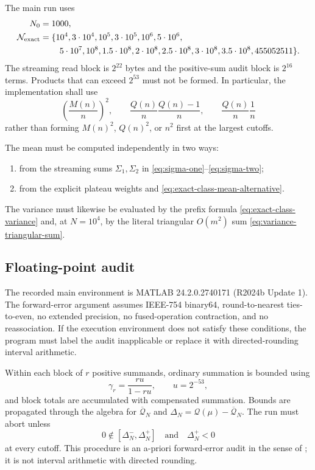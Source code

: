 \documentclass[11pt,reqno]{amsart}
\numberwithin{equation}{section}
\theoremstyle{plain}
\theoremstyle{definition}
\theoremstyle{remark}
\newcommand{\QF}{\mathcal Q}
\begin{document}
The main run uses
\begin{align}
N_0&=1000,
\label{eq:reproducibility-n-zero}\\
\mathcal N_{\mathrm{exact}}
&=\{10^4,3\cdot10^4,10^5,3\cdot10^5,10^6,5\cdot10^6,
\notag\\
&\hspace{8mm}5\cdot10^7,10^8,1.5\cdot10^8,2\cdot10^8,
2.5\cdot10^8,3\cdot10^8,3.5\cdot10^8,455052511\}.
\label{eq:reproducibility-exact-cutoffs}
\end{align}
The streaming read block is \(2^{22}\) bytes and the positive-sum audit
block is \(2^{16}\) terms.  Products that can exceed
\(2^{53}\) must not be formed.  In particular, the implementation shall use
\begin{equation}
\left(\frac{M(n)}n\right)^2,\qquad
\frac{Q(n)}n\frac{Q(n)-1}{n},\qquad
\frac{Q(n)}n\frac1n
\label{eq:safe-division-forms}
\end{equation}
rather than forming \(M(n)^2\), \(Q(n)^2\), or \(n^2\) first at the largest
cutoffs.

The mean must be computed independently in two ways:
\begin{enumerate}[label=(\alph*)]
\item from the streaming sums \(\Sigma_1,\Sigma_2\) in
\eqref{eq:sigma-one}--\eqref{eq:sigma-two};
\item from the explicit plateau weights and
\eqref{eq:exact-class-mean-alternative}.
\end{enumerate}
The variance must likewise be evaluated by the prefix formula
\eqref{eq:exact-class-variance} and, at \(N=10^4\), by the literal triangular
\(O(m^2)\) sum \eqref{eq:variance-triangular-sum}.

\subsection{Floating-point audit}
\label{subsec:floating-point-audit}

The recorded main environment is MATLAB
24.2.0.2740171 (R2024b Update 1).  The forward-error argument assumes
IEEE-754 binary64, round-to-nearest ties-to-even, no extended precision, no
fused-operation contraction, and no reassociation.  If the execution
environment does not satisfy these conditions, the program must label the
audit inapplicable or replace it with directed-rounding interval arithmetic.

Within each block of \(r\) positive summands, ordinary summation is bounded
using
\begin{equation}
\gamma_r=\frac{ru}{1-ru},\qquad u=2^{-53},
\label{eq:higham-gamma}
\end{equation}
and block totals are accumulated with compensated summation.  Bounds are
propagated through the algebra for \(\overline{\QF}_N\) and
\(\Delta_N=\QF(\mu)-\overline{\QF}_N\).  The run must abort unless
\begin{equation}
0\notin[\Delta_N^{-},\Delta_N^{+}]
\quad\text{and}\quad \Delta_N^{+}<0
\label{eq:separation-abort-condition}
\end{equation}
at every cutoff.  This procedure is an a-priori forward-error audit in the
sense of \cite{Higham2002}; it is not interval arithmetic with directed
rounding.
\end{document}
